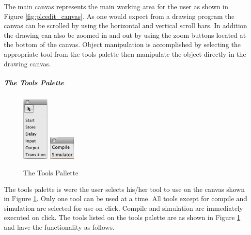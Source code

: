 The main canvas represents the main working area for the user as shown 
in Figure \ref{fig:plcedit_canvas}. As one would expect from a drawing
program the canvas can be scrolled by using the horizontal and vertical 
scroll bars. In addition the drawing can also be zoomed in and out by 
using the zoom buttons located at the bottom of the canvas. Object 
manipulation is accomplished by selecting the appropriate tool from the 
tools palette then manipulate the object directly in the drawing canvas.

\subparagraph{The Tools Palette}

\begin{figure}[htp]
    \centering
    \includegraphics[width=50px]{./images/plcedit_tools.png}
    \includegraphics[width=50px]{./images/plcedit_actions.png}
    \caption{The Tools Pallette}
    \label{fig:plcedit_tools}
\end{figure}

The tools palette is were the user selects his/her tool to use on the 
canvas shown in Figure \ref{fig:plcedit_tools}. Only one tool can be 
used at a time. All tools except for compile and simulation are selected
for use on click. Compile and simulation are immediately executed on click.
The tools listed on the tools palette are as shown in Figure  \ref{fig:plcedit_tools}
and have the functionality as follows.

